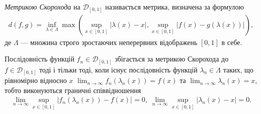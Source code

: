 \begin{definition}
    \emph{Метрикою Скорохода} на $\mathcal{D}_{[0, 1]}$ називається метрика, визначена за формулою
    \begin{gather*}
        d(f, g) = \inf_{\lambda \in \Lambda} \max \left(
            \sup_{x \in [0, 1]} \left|\lambda(x) - x\right|, 
            \sup_{x \in [0, 1]} \left|f(x) - g(\lambda(x))\right|
        \right),
    \end{gather*}
    де $\Lambda$ --- множина строго зростаючих неперервних відображень
    $[0, 1]$ в себе.

    Послідовність функцій $f_n \in \mathcal{D}_{[0, 1]}$ збігається за метрикою Скорохода до $f \in \mathcal{D}_{[0, 1]}$
    тоді і тільки тоді, коли існує послідовність функцій $\lambda_n \in \Lambda$ таких, що
    рівномірно відносно $x$
    $\lim_{n\to\infty} f_n \left(\lambda_n(x)\right) = f(x)$ та
    $\lim_{n\to\infty} \lambda_n(x) = x$, тобто
    виконуються граничні співвідношення
    \begin{gather*}
        \lim_{n\to\infty} \sup_{x\in[0, 1]}\left| f_n \left(\lambda_n(x)\right) - f(x) \right| = 0, \;
        \lim_{n\to\infty} \sup_{x\in[0, 1]}\left| \lambda_n(x) - x \right| = 0.
    \end{gather*}
\end{definition}